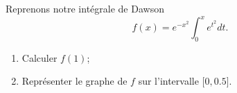 \begin{exercice}\label{exoSC_serie5-0003}

	Reprenons notre intégrale de Dawson 
	\begin{equation}
		f(x)= e^{-x^2}\int_0^x e^{t^2}dt.
	\end{equation}
	\begin{enumerate}

		\item
			Calculer $f(1)$;
		\item
			Représenter le graphe de $f$ sur l'intervalle $\mathopen[ 0 , 0.5 \mathclose]$.

	\end{enumerate}

\end{exercice}
